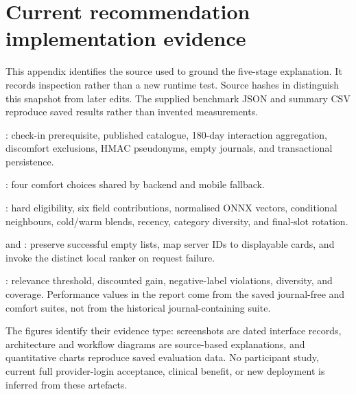 \section{Current recommendation implementation evidence}
\label{sec:code-evidence}

This appendix identifies the source used to ground the five-stage explanation. It records inspection rather than a new runtime test. Source hashes in  distinguish this snapshot from later edits. The supplied benchmark JSON and summary CSV reproduce saved results rather than invented measurements.

\begin{description}[style=nextline,leftmargin=0pt,labelwidth=0pt,labelsep=0pt]
\item[Request construction and ownership]
: check-in prerequisite, published catalogue, 180-day interaction aggregation, discomfort exclusions, HMAC pseudonyms, empty journals, and transactional persistence.
\item[Explicit comfort policy]
: four comfort choices shared by backend and mobile fallback.
\item[Filtering, embeddings, scoring, and selection]
: hard eligibility, six field contributions, normalised ONNX vectors, conditional neighbours, cold/warm blends, recency, category diversity, and final-slot rotation.
\item[Mobile response and degraded operation]
 and : preserve successful empty lists, map server IDs to displayable cards, and invoke the distinct local ranker on request failure.
\item[Metric definitions]
: relevance threshold, discounted gain, negative-label violations, diversity, and coverage. Performance values in the report come from the saved journal-free and comfort suites, not from the historical journal-containing suite.
\end{description}

The figures identify their evidence type: screenshots are dated interface records, architecture and workflow diagrams are source-based explanations, and quantitative charts reproduce saved evaluation data. No participant study, current full provider-login acceptance, clinical benefit, or new deployment is inferred from these artefacts.
